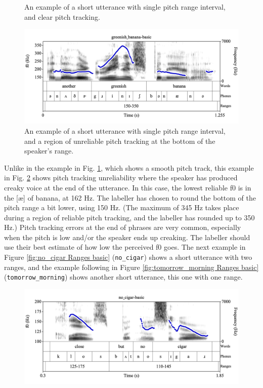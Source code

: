 \documentclass[11pt, twoside]{memoir}
\begin{document}
{{\begin{figure}[H]
\caption{An example of a short utterance with single pitch range interval, and clear pitch tracking.
\label{fig:amelia-knew2 Ranges basic}
}
\end{figure}
\begin{figure}[H]
\centering
\includegraphics[width=.875\linewidth]{Ranges-greenish_banana-basic.png}
\caption[An example of a short utterance with single pitch range interval.]{An example of a short utterance with single pitch range interval, and a region of unreliable pitch tracking at the bottom of the speaker’s range.
\label{fig:greenish-banana Ranges basic}
}
\end{figure}
Unlike in the example in Fig. \ref{fig:amelia-knew2 Ranges basic}, which shows a smooth pitch track, this example in Fig. \ref{fig:greenish-banana Ranges basic} shows pitch tracking unreliability where the speaker has produced creaky voice at the end of the utterance. In this case, the lowest reliable f0 is in the [æ] of banana, at 162 Hz. The labeller has chosen to round the bottom of the pitch range a bit lower, using 150 Hz. (The maximum of 345 Hz takes place during a region of reliable pitch tracking, and the labeller has rounded up to 350 Hz.) Pitch tracking errors at the end of phrases are very common, especially when the pitch is low and/or the speaker ends up creaking. The labeller should use their best estimate of how low the perceived f0 goes. 
The next example in Figure \ref{fig:no_cigar Ranges basic} (\texttt{no\_cigar}) shows a short utterance with two ranges, and the example following in Figure \ref{fig:tomorrow_morning Ranges basic} (\texttt{tomorrow\_morning}) shows another short utterance, this one with one range.
\begin{figure}[H]
\centering
\includegraphics[width=.875\linewidth]{Ranges-no_cigar-basic.png}

\end{figure}}}
\end{document}
